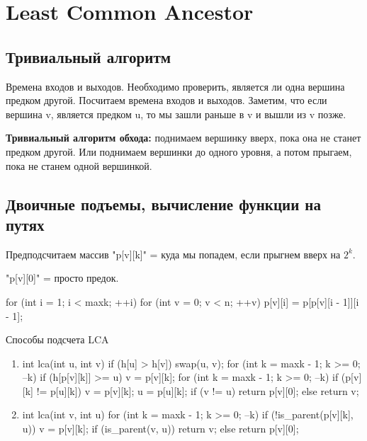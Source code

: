 \chapter{Least Common Ancestor}

\section{Тривиальный алгоритм}
Времена входов и выходов. 
Необходимо проверить, является ли одна вершина предком другой. 
Посчитаем времена входов и выходов. Заметим, что если вершина v, является
предком u, то мы зашли раньше в v и вышли из v позже. 
              
\textbf{Тривиальный алгоритм обхода:} поднимаем вершинку вверх, пока она не станет 
предком другой.
Или поднимаем вершинки до одного уровня, а потом прыгаем, пока не станем одной вершинкой.

\section{Двоичные подъемы, вычисление функции на путях}

Предподсчитаем массив \cpp"p[v][k]" = куда мы попадем, если прыгнем вверх на $2^k$.

\cpp"p[v][0]" = просто предок. 

\begin{cppcode}
for (int i = 1; i < maxk; ++i) {
    for (int v = 0; v < n; ++v) {
        p[v][i] = p[p[v][i - 1]][i - 1];
    }
}
\end{cppcode}

Способы подсчета LCA
\begin{enumerate}
\item 

    \begin{cppcode}
    int lca(int u, int v) {
        if (h[u] > h[v]) swap(u, v);
        for (int k = maxk - 1; k >= 0; --k) {
            if (h[p[v][k]] >= u) {
                v = p[v][k];
            }
        }
        for (int k = maxk - 1; k >= 0; --k) {
            if (p[v][k] != p[u][k]) {
                v = p[v][k];
                u = p[u][k];
            }
        }
        if (v != u) {
            return p[v][0];
        } else {
            return v;
        }
    }
    \end{cppcode} 
\item
 
    \begin{cppcode}
    int lca(int v, int u) {
        for (int k = maxk - 1; k >= 0; --k) {
            if (!is_parent(p[v][k], u)) {
                v = p[v][k];
            }
        }
        if (is_parent(v, u)) return v;
        else return p[v][0]; 
    }
    \end{cppcode}
\end{enumerate}

